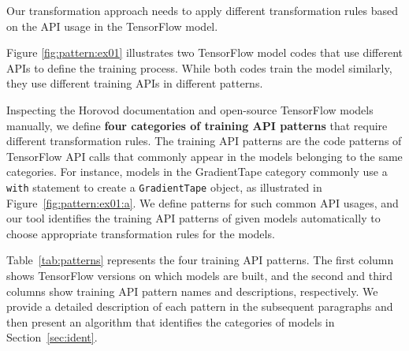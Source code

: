 Our transformation approach needs to apply different transformation rules based
on the API usage in the TensorFlow model. 
\begin{inred}
Figure \ref{fig:pattern:ex01} illustrates two TensorFlow model codes that use
different APIs to define the training process.
While both codes train the model similarly, they use different training
APIs in different patterns.
\end{inred}
Inspecting the Horovod documentation and open-source TensorFlow models
manually, we define \textbf{four categories of training API patterns} that require
different transformation rules. 
The training API patterns are the code patterns of TensorFlow API calls that
commonly appear in the models belonging to the same categories.
For instance, models in the {GradientTape} category commonly use a {\tt with}
statement to create a {\tt GradientTape} object, as illustrated in
Figure~\ref{fig:pattern:ex01:a}.
We define patterns for such common API usages, and our tool identifies the
training API patterns of given models automatically to choose appropriate
transformation rules for the models.

Table~\ref{tab:patterns} represents the four training API patterns. 
The first column shows TensorFlow versions on which models are built, and the
second and third columns show training API pattern names and descriptions,
respectively.
We provide a detailed description of each pattern in the subsequent paragraphs
and then present an algorithm that identifies the categories of models in
Section~\ref{sec:ident}.


